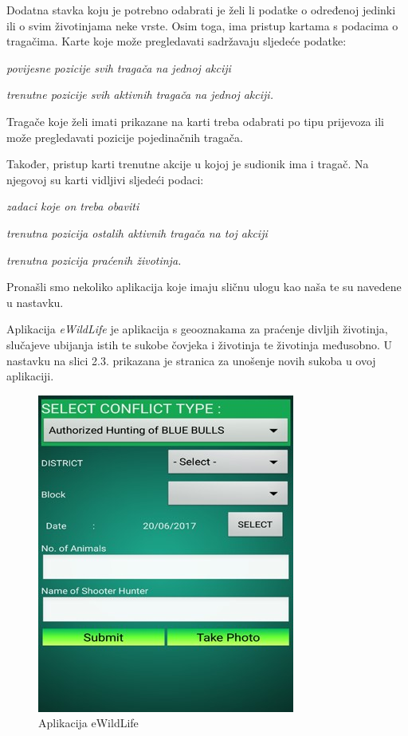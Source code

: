 		Dodatna stavka koju je potrebno odabrati je želi li podatke o određenoj jedinki ili o svim životinjama neke vrste. 
		Osim toga, ima pristup kartama s podacima o tragačima. Karte koje može pregledavati sadržavaju sljedeće podatke:
		\begin{packed_item}
			\item \textit{povijesne pozicije svih tragača na jednoj akciji}
			\item \textit{trenutne pozicije svih aktivnih tragača na jednoj akciji.}
		\end{packed_item}
		
		Tragače koje želi imati prikazane na karti treba odabrati po tipu prijevoza ili može pregledavati pozicije pojedinačnih tragača.
		
		Također, pristup karti trenutne akcije u kojoj je sudionik ima i tragač.
		Na njegovoj su karti vidljivi sljedeći podaci:
		\begin{packed_item}
			\item \textit{zadaci koje on treba obaviti}
			\item \textit{trenutna pozicija ostalih aktivnih tragača na toj akciji}
			\item \textit{trenutna pozicija praćenih životinja.}
		\end{packed_item}
		
		Pronašli smo nekoliko aplikacija koje imaju sličnu ulogu kao naša te su navedene u nastavku.
		
		Aplikacija \textit{eWildLife} je aplikacija s geooznakama za praćenje divljih životinja, slučajeve ubijanja istih te sukobe čovjeka i životinja te životinja međusobno. U nastavku na slici 2.3. prikazana je stranica za unošenje novih sukoba u ovoj aplikaciji.
		
		\begin{figure}[H]
			\includegraphics[scale=0.75]{slike/primjera1.JPG} %
			\centering
			\caption{Aplikacija eWildLife}
			\label{fig:ewildlife} %
		\end{figure}
		
